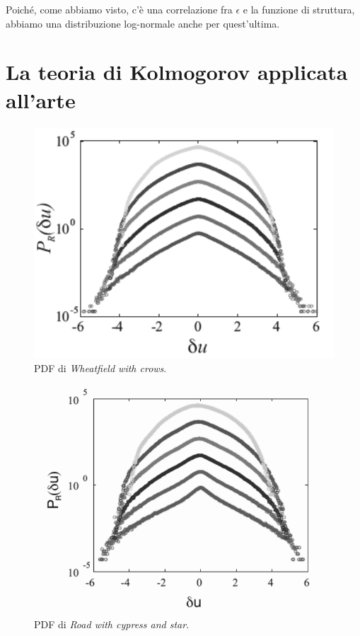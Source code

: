 \documentclass[12pt,a4paper]{article}
\numberwithin{equation}{section}
\begin{document}
Poiché, come abbiamo visto, c'è una correlazione fra $\epsilon$ e la funzione di struttura, abbiamo una distribuzione log-normale anche per quest'ultima.

\section{La teoria di Kolmogorov applicata all'arte}

\begin{figure}
    \centering
    \includegraphics[scale=0.4]{PDF_wheat.png}
    \caption{PDF di \emph{Wheatfield with crows}.}
    \label{wheatfieldpdf}
\end{figure}

\begin{figure}
    \centering
    \includegraphics[scale=0.4]{PDF_road.png}
    \caption{PDF di \emph{Road with cypress and star}.}
    \label{roadpdf}
\end{figure}
\end{document}
